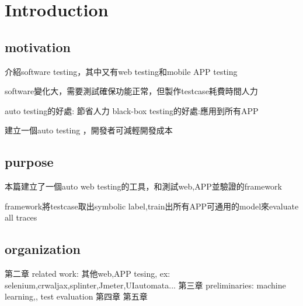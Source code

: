 
\chapter{Introduction}\label{ch:introduction}

\section{motivation}

介紹software testing，其中又有web testing和mobile APP testing

software變化大，需要測試確保功能正常，但製作testcase耗費時間人力

auto testing的好處: 節省人力 black-box testing的好處:應用到所有APP

建立一個auto testing ，開發者可減輕開發成本


\section{purpose}

本篇建立了一個auto web testing的工具，和測試web,APP並驗證的framework

framework將testcase取出symbolic label,train出所有APP可通用的model來evaluate all traces 


\section{organization}

第二章 related work: 其他web,APP tesing, ex: selenium,crwaljax,splinter,Jmeter,UIautomata...
第三章 preliminaries: machine learning,, test evaluation
第四章
第五章

